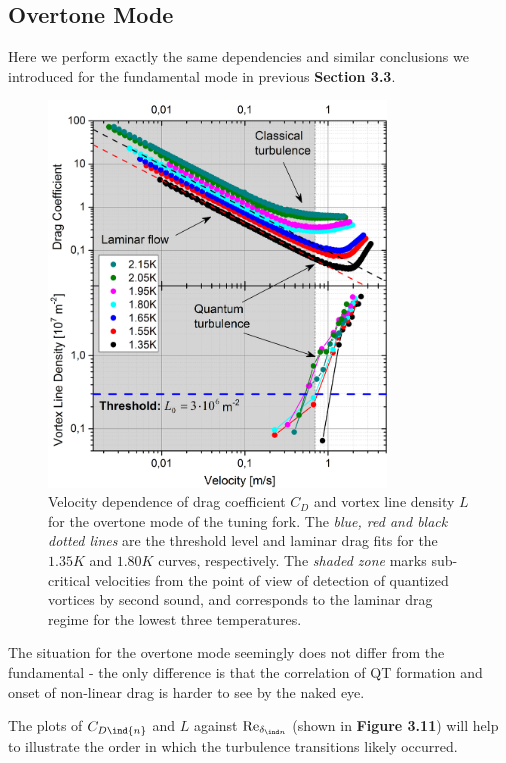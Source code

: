\newpage


\subsection*{Overtone Mode}

Here we perform exactly the same dependencies and similar conclusions we introduced for the fundamental mode in previous {\sffamily\textbf{Section 3.3}}.

\begin{figure}[h!]
	\centering
	\includegraphics[width=0.8\textwidth]{graphs/Merged_C+L_over}
	\caption{Velocity dependence of drag coefficient $ C_D $ and vortex line density $ L $ for the overtone mode of the tuning fork. The \textit{blue, red and black dotted lines} are the threshold level and laminar drag fits for the $ 1.35\unit{K} $ and $ 1.80\unit{K} $ curves, respectively. The \textit{shaded zone} marks sub-critical velocities from the point of view of detection of quantized vortices by second sound, and corresponds to the laminar drag regime for the lowest three temperatures.}
\end{figure}

The situation for the overtone mode seemingly does not differ from the fundamental - the only difference is that the correlation of QT formation and onset of non-linear drag is harder to see by the naked eye.

The plots of $ C_{D\ind{n}} $ and $ L $ against $ \text{Re}_{\delta_{\ind n}} $ (shown in {\sffamily\textbf{Figure 3.11}}) will help to illustrate the order in which the turbulence transitions likely occurred.


